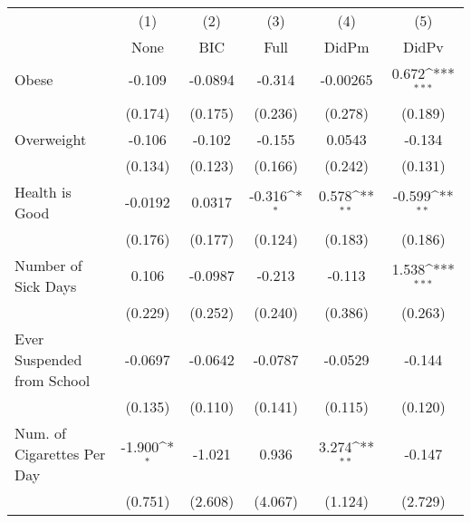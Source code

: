 {
\def\sym#1{\ifmmode^{#1}\else\(^{#1}\)\fi}
\begin{tabular}{l*{5}{c}}
\toprule
            &\multicolumn{1}{c}{(1)}&\multicolumn{1}{c}{(2)}&\multicolumn{1}{c}{(3)}&\multicolumn{1}{c}{(4)}&\multicolumn{1}{c}{(5)}\\
            &\multicolumn{1}{c}{None}&\multicolumn{1}{c}{BIC}&\multicolumn{1}{c}{Full}&\multicolumn{1}{c}{DidPm}&\multicolumn{1}{c}{DidPv}\\
\midrule
Obese       &      -0.109         &     -0.0894         &      -0.314         &    -0.00265         &       0.672\sym{***}\\
            &     (0.174)         &     (0.175)         &     (0.236)         &     (0.278)         &     (0.189)         \\
\addlinespace
Overweight  &      -0.106         &      -0.102         &      -0.155         &      0.0543         &      -0.134         \\
            &     (0.134)         &     (0.123)         &     (0.166)         &     (0.242)         &     (0.131)         \\
\addlinespace
Health is Good&     -0.0192         &      0.0317         &      -0.316\sym{*}  &       0.578\sym{**} &      -0.599\sym{**} \\
            &     (0.176)         &     (0.177)         &     (0.124)         &     (0.183)         &     (0.186)         \\
\addlinespace
Number of Sick Days&       0.106         &     -0.0987         &      -0.213         &      -0.113         &       1.538\sym{***}\\
            &     (0.229)         &     (0.252)         &     (0.240)         &     (0.386)         &     (0.263)         \\
\addlinespace
Ever Suspended from School&     -0.0697         &     -0.0642         &     -0.0787         &     -0.0529         &      -0.144         \\
            &     (0.135)         &     (0.110)         &     (0.141)         &     (0.115)         &     (0.120)         \\
\addlinespace
Num. of Cigarettes Per Day&      -1.900\sym{*}  &      -1.021         &       0.936         &       3.274\sym{**} &      -0.147         \\
            &     (0.751)         &     (2.608)         &     (4.067)         &     (1.124)         &     (2.729)         \\
\bottomrule
\end{tabular}
}
